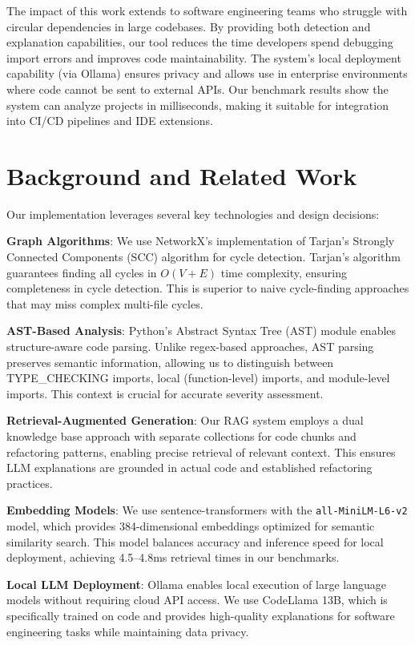 \documentclass[paper=a4, fontsize=11pt]{scrartcl} %
\begin{document}
The impact of this work extends to software engineering teams who struggle with circular dependencies in large codebases. By providing both detection and explanation capabilities, our tool reduces the time developers spend debugging import errors and improves code maintainability. The system's local deployment capability (via Ollama) ensures privacy and allows use in enterprise environments where code cannot be sent to external APIs. Our benchmark results show the system can analyze projects in milliseconds, making it suitable for integration into CI/CD pipelines and IDE extensions.

\section{Background and Related Work}

Our implementation leverages several key technologies and design decisions:

\textbf{Graph Algorithms}: We use NetworkX's implementation of Tarjan's Strongly Connected Components (SCC) algorithm for cycle detection. Tarjan's algorithm guarantees finding all cycles in $O(V + E)$ time complexity, ensuring completeness in cycle detection. This is superior to naive cycle-finding approaches that may miss complex multi-file cycles.

\textbf{AST-Based Analysis}: Python's Abstract Syntax Tree (AST) module enables structure-aware code parsing. Unlike regex-based approaches, AST parsing preserves semantic information, allowing us to distinguish between TYPE\_CHECKING imports, local (function-level) imports, and module-level imports. This context is crucial for accurate severity assessment.

\textbf{Retrieval-Augmented Generation}: Our RAG system employs a dual knowledge base approach with separate collections for code chunks and refactoring patterns, enabling precise retrieval of relevant context. This ensures LLM explanations are grounded in actual code and established refactoring practices.

\textbf{Embedding Models}: We use sentence-transformers with the \texttt{all-MiniLM-L6-v2} model, which provides 384-dimensional embeddings optimized for semantic similarity search. This model balances accuracy and inference speed for local deployment, achieving 4.5--4.8ms retrieval times in our benchmarks.

\textbf{Local LLM Deployment}: Ollama enables local execution of large language models without requiring cloud API access. We use CodeLlama 13B, which is specifically trained on code and provides high-quality explanations for software engineering tasks while maintaining data privacy.
\end{document}
